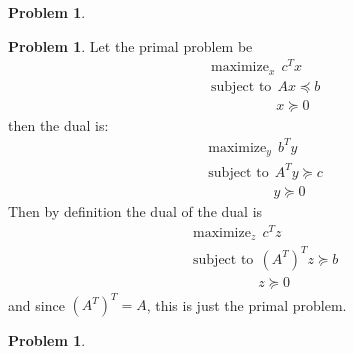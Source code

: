 \documentclass[letterpaper,12pt]{article}
\theoremstyle{definition}
\newtheorem{problem}[theorem]{Problem}
\begin{document}
\begin{problem}{8.15}

\end{problem}

\begin{problem}{8.17}
Let the primal problem be   
\begin{align*}
&\text{maximize}_x \ \ c^Tx \\
  &\text{subject to} \ \ Ax \preceq b \\
  &\qquad \qquad \ \ \ x \succeq 0
\end{align*}
then the dual is:
\begin{align*}
&\text{maximize}_y \ \ b^Ty \\
  &\text{subject to} \ \ A^Ty \succeq c \\
  &\qquad \qquad \ \ \ y \succeq 0
\end{align*}
Then by definition the dual of the dual is
\begin{align*}
&\text{maximize}_z \ \ c^Tz \\
  &\text{subject to} \ \ (A^T)^Tz \succeq b \\
  &\qquad \qquad \ \ \ z \succeq 0
\end{align*}
and since $(A^T)^T = A$, this is just the primal problem.
\end{problem}

\begin{problem}{8.18}
\end{problem}
\end{document}
